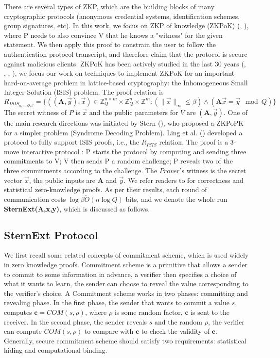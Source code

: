 There are several types of ZKP, which are the building blocks of many
cryptographic protocols (anonymous credential systems, identification schemes,
group signatures, etc). In this work, we focus on ZKP of knowledge (ZKPoK)
(\cite{bellare1992defining}, \cite{goldwasser1989knowledge}), where P needs to
also convince V that he knows a "witness" for the given statement. We then apply
this proof to constrain the user to follow the authentication protocol transcript,
and therefore claim that the protocol is secure against malicious clients.
ZKPoK has been actively studied in the last 30 years (\cite{feige1988zero},
\cite{rackoff1991non}, \cite{micciancio2003statistical},
\cite{ling2013improved}), we focus our work on techniques to implement ZKPoK for an
important hard-on-average problem in lattice-based cryptography: the
Inhomogeneous Small Integer Solution (ISIS) problem. The proof relation is
\[ R_{ISIS_{n,m,Q,\beta}} = \{ ((\mathbf{A},\vec{y}),\vec{x}) \in
  \mathbb{Z}_Q^{n\times m} \times \mathbb{Z}_Q^n \times \mathbb{Z}^m:
  (\|\vec{x}\|_\infty \leq \beta) \land (\mathbf{A}\vec{x} = \vec{y} \mod Q) \}
\]
The secret witness of \(P\) is \(\vec{x}\) and the public parameters for \(V\)
are \((\mathbf{A},\vec{y})\).  One of the main research directions was initiated
by Stern (\cite{stern1993new}), who proposed a ZKPoPK for a simpler problem
(Syndrome Decoding Problem).  Ling et al. (\cite{ling2013improved}) developed a
protocol to fully support ISIS proofs, i.e., the $R_{ISIS}$ relation. The proof
is a 3-move interactive protocol : P starts the protocol by computing and
sending three commitments to V; V then sends P a random challenge; P reveals two
of the three commitments according to the challenge. The $Prover$'s witness is
the secret vector $\vec{x}$, the public inputs are $\mathbf{A}$ and
$\vec{y}$. We refer readers to \cite{ling2013improved} for correctness and
statistical zero-knowledge proofs. As per their results, each round of
communication costs $\log\beta\tilde{O}(n \log Q)$ bits, and we denote the whole
run \textbf{SternExt(A,x,y)}, which is discussed as follows.

\subsection{SternExt Protocol}
\label{append:Stern}
We first recall some related concepts of commitment scheme, which is used widely
in zero knowledge proofs. Commitment scheme is a primitive that allows a sender
to commit to some information in advance, a verifier then specifies a choice of
what it wants to learn, the sender can choose to reveal the value corresponding
to the verifier's choice. A Commitment scheme works in two phases: committing
and revealing phase. In the first phase, the sender that wants to commit a value
$s$, computes $\mathbf{c} = COM(s, \rho)$, where $\rho$ is some random factor,
$\mathbf{c}$ is sent to the receiver. In the second phase, the sender reveals
$s$ and the random $\rho$, the verifier can compute $COM(s,\rho)$ to compare
with $\mathbf{c}$ to check the validity of $\mathbf{c}$. Generally, secure commitment scheme should satisfy two requirements: statistical hiding and computational binding.

